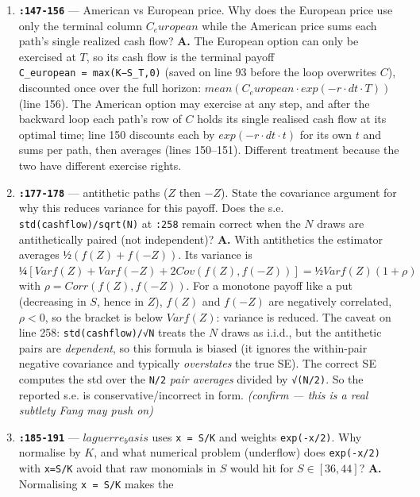 \documentclass[
  11pt,
]{article}
\begin{document}
\begin{enumerate}
  exactly one \(1\) per exercised path marking its optimal stopping time
  --- it is the discrete exercise/stopping policy.
\item
  \textbf{\texttt{:147-156}} --- American vs European price. Why does
  the European price use only the terminal column \(C_european\) while
  the American price sums each path's single realized cash flow?
  \textbf{A.} The European option can only be exercised at \(T\), so its
  cash flow is the terminal payoff
  \texttt{C\_european\ =\ max(K−S\_T,0)} (saved on line 93 before the
  loop overwrites \(C\)), discounted once over the full horizon:
  \(mean(C_european·exp(−r·dt·T))\) (line 156). The American option may
  exercise at any step, and after the backward loop each path's row of
  \(C\) holds its single realised cash flow at its optimal time; line
  150 discounts each by \(exp(−r·dt·t)\) for its own \(t\) and sums per
  path, then averages (lines 150--151). Different treatment because the
  two have different exercise rights.
\item
  \textbf{\texttt{:177-178}} --- antithetic paths (\(Z\) then \(-Z\)).
  State the covariance argument for why this reduces variance for this
  payoff. Does the s.e. \texttt{std(cashflow)/sqrt(N)} at \texttt{:258}
  remain correct when the \(N\) draws are antithetically paired (not
  independent)? \textbf{A.} With antithetics the estimator averages
  \(½(f(Z)+f(−Z))\). Its variance is
  \(¼[Var f(Z) + Var f(−Z) + 2Cov(f(Z),f(−Z))] = ½ Var f(Z)(1 + ρ)\)
  with \(ρ = Corr(f(Z),f(−Z))\). For a monotone payoff like a put
  (decreasing in \(S\), hence in \(Z\)), \(f(Z)\) and \(f(−Z)\) are
  negatively correlated, \(ρ<0\), so the bracket is below \(Var f(Z)\):
  variance is reduced. The caveat on line 258: \texttt{std(cashflow)/√N}
  treats the \(N\) draws as i.i.d., but the antithetic pairs are
  \emph{dependent}, so this formula is biased (it ignores the
  within-pair negative covariance and typically \emph{overstates} the
  true SE). The correct SE computes the std over the \texttt{N/2}
  \emph{pair averages} divided by \texttt{√(N/2)}. So the reported s.e.
  is conservative/incorrect in form. \emph{(confirm --- this is a real
  subtlety Fang may push on)}
\item
  \textbf{\texttt{:185-191}} --- \(laguerre_basis\) uses
  \texttt{x\ =\ S/K} and weights \texttt{exp(-x/2)}. Why normalise by
  \(K\), and what numerical problem (underflow) does \texttt{exp(-x/2)}
  with \texttt{x=S/K} avoid that raw monomials in \(S\) would hit for
  \(S∈[36,44]\)? \textbf{A.} Normalising \texttt{x\ =\ S/K} makes the

\end{enumerate}
\end{document}
